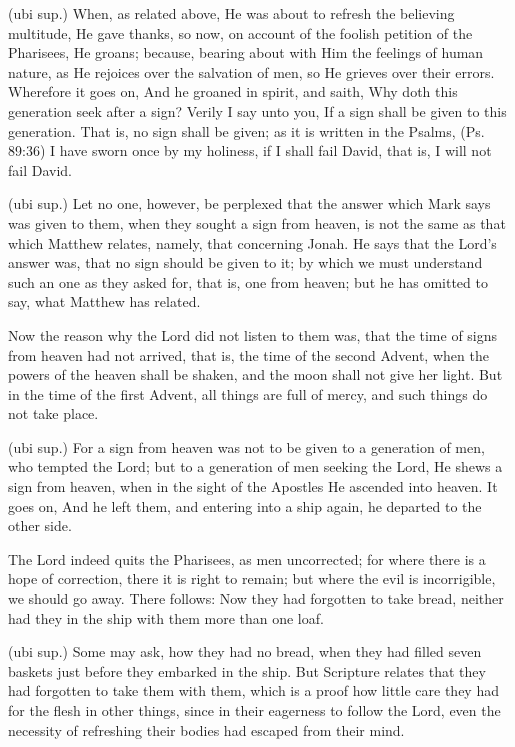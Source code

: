  (ubi sup.) When, as related above, He was about to refresh the believing multitude, He gave thanks, so now, on account of the foolish petition of the Pharisees, He groans; because, bearing about with Him the feelings of human nature, as He rejoices over the salvation of men, so He grieves over their errors. Wherefore it goes on, And he groaned in spirit, and saith, Why doth this generation seek after a sign? Verily I say unto you, If a sign shall be given to this generation. That is, no sign shall be given; as it is written in the Psalms, (Ps. 89:36) I have sworn once by my holiness, if I shall fail David, that is, I will not fail David.

 (ubi sup.) Let no one, however, be perplexed that the answer which Mark says was given to them, when they sought a sign from heaven, is not the same as that which Matthew relates, namely, that concerning Jonah. He says that the Lord’s answer was, that no sign should be given to it; by which we must understand such an one as they asked for, that is, one from heaven; but he has omitted to say, what Matthew has related.

 Now the reason why the Lord did not listen to them was, that the time of signs from heaven had not arrived, that is, the time of the second Advent, when the powers of the heaven shall be shaken, and the moon shall not give her light. But in the time of the first Advent, all things are full of mercy, and such things do not take place.

 (ubi sup.) For a sign from heaven was not to be given to a generation of men, who tempted the Lord; but to a generation of men seeking the Lord, He shews a sign from heaven, when in the sight of the Apostles He ascended into heaven. It goes on, And he left them, and entering into a ship again, he departed to the other side.

 The Lord indeed quits the Pharisees, as men uncorrected; for where there is a hope of correction, there it is right to remain; but where the evil is incorrigible, we should go away. There follows: Now they had forgotten to take bread, neither had they in the ship with them more than one loaf.

 (ubi sup.) Some may ask, how they had no bread, when they had filled seven baskets just before they embarked in the ship. But Scripture relates that they had forgotten to take them with them, which is a proof how little care they had for the flesh in other things, since in their eagerness to follow the Lord, even the necessity of refreshing their bodies had escaped from their mind.

